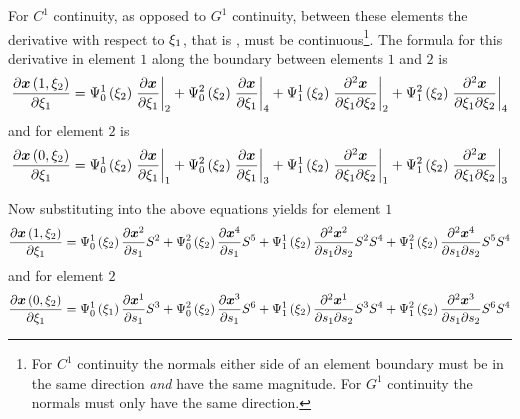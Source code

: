 For $C^{1}$ continuity, as opposed to $G^{1}$ continuity, between these
elements the derivative with respect to $\xi_{1}$, that is
, must be continuous\footnote{For
  $C^{1}$ continuity the normals either side of an element boundary must be in
  the same direction \emph{and} have the same magnitude. For $G^{1}$
  continuity the normals must only have the same direction.}. The formula for
this derivative in element $\mathit{1}$ along the boundary between elements
$\mathit{1}$ and $\mathit{2}$ is
\begin{equation}
  \delby{\fnof{\vect{x}}{1,\xitwo}}{\xione}=\chbfn{0}{1}{\xitwo}\evalat{
      \delby{\vect{x}}{\xione}}{2}+\chbfn{0}{2}{\xitwo}\evalat{
      \delby{\vect{x}}{\xione}}{4}+\chbfn{1}{1}{\xitwo}\evalat{
      \deltwoby{\vect{x}}{\xione}{\xitwo}}{2}+\chbfn{1}{2}{\xitwo}\evalat{
      \deltwoby{\vect{x}}{\xione}{\xitwo}}{4}
  \label{eqn:c1contelem1}
\end{equation}
and for element $\mathit{2}$ is
\begin{equation}
  \delby{\fnof{\vect{x}}{0,\xitwo}}{\xione}=\chbfn{0}{1}{\xitwo}\evalat{
    \delby{\vect{x}}{\xione}}{1}+\chbfn{0}{2}{\xitwo}\evalat{
    \delby{\vect{x}}{\xione}}{3}+\chbfn{1}{1}{\xitwo}\evalat{
    \deltwoby{\vect{x}}{\xione}{\xitwo}}{1}+\chbfn{1}{2}{\xitwo}\evalat{
    \deltwoby{\vect{x}}{\xione}{\xitwo}}{3}
  \label{eqn:c1contelem2}
\end{equation}

Now substituting  into the
above equations yields for element $\mathit{1}$
\begin{equation}
  \delby{\fnof{\vect{x}}{1,\xitwo}}{\xione} =
  \chbfn{0}{1}{\xitwo}\delby{\nodept{\vect{x}}{2}}{s_{1}}\esfone{2}+
  \chbfn{0}{2}{\xitwo}\delby{\nodept{\vect{x}}{4}}{s_{1}}\esfone{5}+
  \chbfn{1}{1}{\xitwo}\deltwoby{\nodept{\vect{x}}{2}}{s_{1}}{s_{2}}
  \esfone{2}\esfone{4}+
  \chbfn{1}{2}{\xitwo}\deltwoby{\nodept{\vect{x}}{4}}{s_{1}}{s_{2}}
  \esfone{5}\esfone{4} 
\end{equation}
and for element $\mathit{2}$
\begin{equation}
  \delby{\fnof{\vect{x}}{0,\xitwo}}{\xione} =
  \chbfn{0}{1}{\xione}\delby{\nodept{\vect{x}}{1}}{s_{1}}\esfone{3}+
  \chbfn{0}{2}{\xitwo}\delby{\nodept{\vect{x}}{3}}{s_{1}}\esfone{6}+ 
  \chbfn{1}{1}{\xitwo}\deltwoby{\nodept{\vect{x}}{1}}{s_{1}}{s_{2}}
  \esfone{3}\esfone{4}+ 
  \chbfn{1}{2}{\xitwo}\deltwoby{\nodept{\vect{x}}{3}}{s_{1}}{s_{2}}
  \esfone{6}\esfone{4}
\end{equation}

